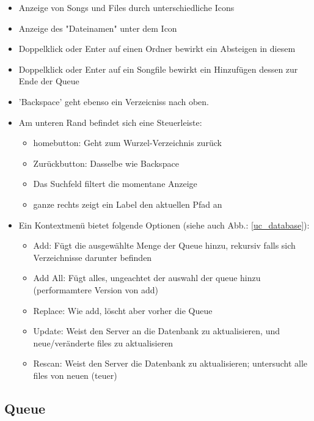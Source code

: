 \begin{itemize}
   \item Anzeige von Songs und Files durch unterschiedliche Icons
   \item Anzeige des "Dateinamen" unter dem Icon
   \item Doppelklick oder Enter auf einen Ordner bewirkt ein Absteigen in diesem
   \item Doppelklick oder Enter auf ein Songfile bewirkt ein Hinzufügen dessen zur Ende der Queue
   \item 'Backspace' geht ebenso ein Verzeicniss nach oben.
   \item Am unteren Rand befindet sich eine Steuerleiste:
   \begin{itemize}
     \item homebutton: Geht zum Wurzel-Verzeichnis zurück
     \item Zurückbutton: Dasselbe wie Backspace
     \item Das Suchfeld filtert die momentane Anzeige
     \item ganze rechts zeigt ein Label den aktuellen Pfad an
   \end{itemize}
   \item Ein Kontextmenü bietet folgende Optionen (siehe auch Abb.: \ref{uc_database}):
   \begin{itemize}
     \item Add: Fügt die ausgewählte Menge der Queue hinzu, rekursiv falls sich Verzeichnisse darunter befinden
     \item Add All: Fügt alles, ungeachtet der auswahl der queue hinzu (performamtere Version von add)
     \item Replace: Wie add, löscht aber vorher die Queue
     \item Update: Weist den Server an die Datenbank zu aktualisieren, und neue/veränderte files zu aktualisieren
     \item Rescan: Weist den Server die Datenbank zu aktualisieren; untersucht alle files von neuen (teuer)
   \end{itemize}
\end{itemize}


\subsection{Queue}

